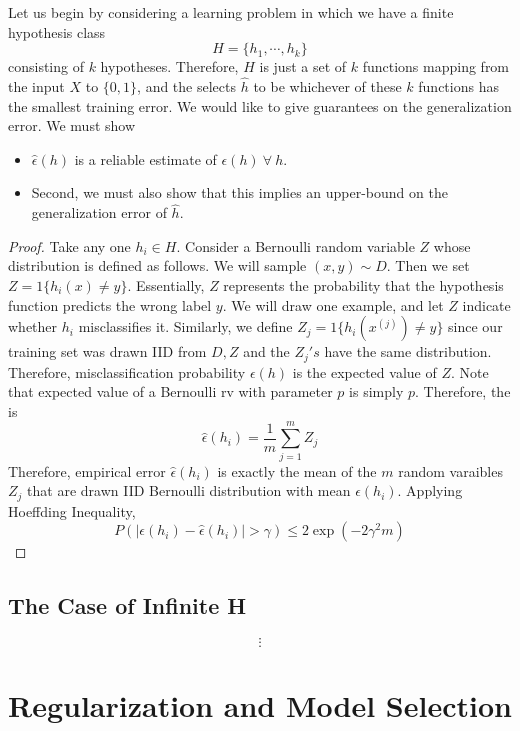 \documentclass[12pt]{scrartcl}
\begin{document}
Let us begin by considering a learning problem in 
which we have a finite hypothesis class
\[H = \{h_1, \cdots, h_k\}\]
consisting of $k$ hypotheses. Therefore, 
$H$ is just a set of $k$ functions mapping from 
the input $X$ to $\{0, 1\}$, and the 
selects $\hat h$ to be whichever of these $k$ functions 
has the smallest training error. We would like to give
guarantees on the generalization error. We must show
\begin{itemize}
\item $\hat{\epsilon}(h)$ is a reliable estimate of $\epsilon(h) \ \forall \ h$.
\item Second, we must also show that this implies an upper-bound on the 
generalization error of $\hat h$.
\end{itemize}

\begin{proof}

    Take any one $h_i \in H$. Consider a Bernoulli random
    variable $Z$ whose distribution is defined as follows.
    We will sample $(x,y) \sim D$. Then we set $Z = 1\{h_i(x) \neq y\}$. 
    Essentially, $Z$ represents the probability that the hypothesis function predicts
    the wrong label $y$. We will draw one example, and let $Z$ indicate
    whether $h_i$ misclassifies it. Similarly, we define 
    $Z_j = 1\{h_i(x^{(j)}) \neq y\}$ since our training set was drawn
    IID from $D, Z$ and the $Z_j's$ have the same distribution.
    Therefore, misclassification probability $\epsilon(h)$ is 
    the expected value of $Z$. Note that expected value of a Bernoulli rv
    with parameter $p$ is simply $p$.
    Therefore, the  is 
    \[\hat{\epsilon}(h_i) = \frac{1}{m}\sum_{j=1}^m Z_j\]
    Therefore, empirical error $\hat{\epsilon}(h_i)$ is exactly
    the mean of the $m$ random varaibles $Z_j$ that are drawn IID Bernoulli distribution
    with mean $\epsilon(h_i)$. Applying Hoeffding Inequality,
    \[P(|\epsilon(h_i) - \hat{\epsilon}(h_i)| > \gamma) \leq 2\exp(-2\gamma^2m)\]
\end{proof}

\begin{theorem}
    
\end{theorem}

\subsection{The Case of Infinite H}

\[\vdots\]

\section{Regularization and Model Selection}
\end{document}
